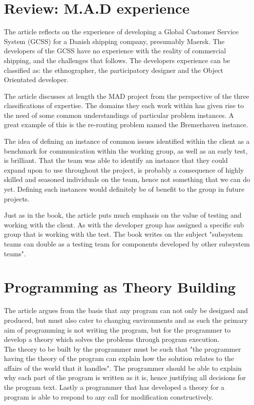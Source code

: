 \documentclass[12pt]{article}
\begin{document}
\newpage
\section{Review: M.A.D experience}
\label{Review1}
The article reflects on the experience of developing a Global Customer Service System (GCSS) for a Danish shipping company, presumably Maersk. The developers of the GCSS have no experience with the reality of commercial shipping, and the challenges that follows. The developers experience can be classified as: the ethnographer, the participatory designer and the Object Orientated developer.

The article discusses at length the MAD project from the perspective of the three classifications of expertise. The domains they each work within has given rise to the need of some common understandings of particular problem instances. A great example of this is the re-routing problem named the Bremerhaven instance.

The idea of defining an instance of common issues identified within the client as a benchmark for communication within the working group, as well as an early test, is brilliant. That the team was able to identify an instance that they could expand upon to use throughout the project, is probably a consequence of highly skilled and seasoned individuals on the team, hence not something that we can do yet. Defining such instances would definitely be of benefit to the group in future projects.

Just as in the book, the article puts much emphasis on the value of testing and working with the client. As with the developer group has assigned a specific sub group that is working with the test. The book writes on the subject "subsystem teams can double as a testing team for components developed by other subsystem teams".  
\newpage
\section{Programming as Theory Building}
\label{Review2}
The article argues from the basis that any program can not only be designed and produced, but must also cater to changing environments and as such the primary aim of programming is not writing the program, but for the programmer to develop a theory which solves the problems through program execution.\\

The theory to be built by the programmer must be such that "the programmer having the theory of the program can explain how the solution relates to the affairs of the world that it handles". The programmer should be able to explain why each part of the program is written as it is, hence justifying all decisions for the program text. Lastly a programmer that has developed a theory for a program is able to respond to any call for modification constructively.\\
\end{document}
